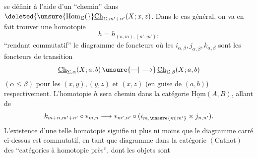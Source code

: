se définir à l'aide d'un ``chemin'' dans $\deleted{\unsure{\operatorname{Hom}_\Sigma(}}\underline{\mathrm{Ch}}_{\Sigma,m'+n'}(X;x,z)$. Dans le cas général, on va en fait trouver une homotopie 
\[
h=h_{(n,m),(n',m')},
\]
``rendant commutatif'' le diagramme de foncteurs
où les $i_{\alpha,\beta},j_{\alpha,\beta},k_{\alpha,\beta}$ sont les foncteurs de transition
\[
\underline{\mathrm{Ch}}_{\Sigma,\alpha}(X;a,b)\,\unsure{\text{---}|\longrightarrow}\,\underline{\mathrm{Ch}}_{\Sigma,\beta}(X;a,b)
\]
$(\alpha\leq\beta)$ pour les  $(x,y),(y,z)$ et $(x,z)$ (en guise de $(a,b)$) respectivement. L'homotopie $h$ sera   chemin dans la catégorie $\underline{\mathrm{Hom}}(A,B)$,  allant de
\[
k_{m+n,m'+n'}\circ *_{m,n}\longrightarrow *_{m',n'}\circ(i_{m,\unsure{m|m'}}\times j_{n,n'}).
\]
L'existence d'une telle homotopie signifie  ni plus ni moins que le diagramme carré ci-dessus est commutatif, en tant que diagramme dans la catégorie $(\mathrm{Cathot})$ des ``catégories à homotopie près'', dont les objets sont

